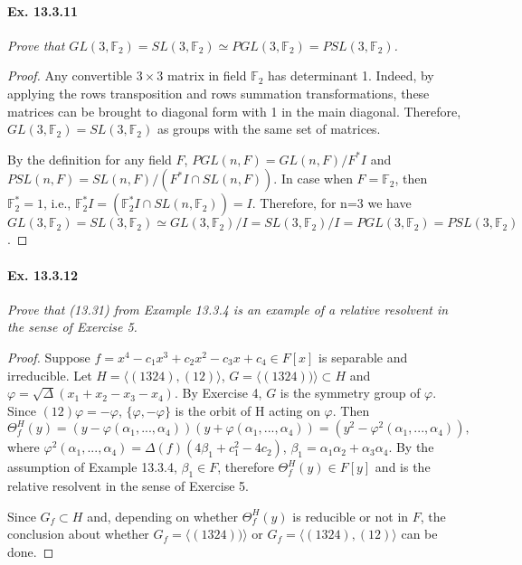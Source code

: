 \documentclass[11pt,a4paper]{article}
\begin{document}
\paragraph{Ex. 13.3.11}

{\it Prove that  $GL(3,\mathbb{F}_2)=SL(3,\mathbb{F}_2) \simeq PGL(3,\mathbb{F}_2)=PSL(3,\mathbb{F}_2)$. 

\begin{proof}
Any convertible $3\times 3$ matrix in field $\mathbb{F}_2$ has determinant 1. Indeed, by applying the rows transposition and rows summation transformations, these matrices can be brought to diagonal form with 1 in the main diagonal. Therefore, $GL(3,\mathbb{F}_2)=SL(3,\mathbb{F}_2)$ as groups with the same set of matrices.

By the definition for any field $F$, $PGL(n,F)=GL(n,F)/F^*I$ and $PSL(n,F)=SL(n,F)/(F^*I\cap SL(n,F))$. In case when $F=\mathbb{F}_2$, then $\mathbb{F}_2^*=1$, i.e., $\mathbb{F}_2^*I=(\mathbb{F}_2^*I\cap SL(n,\mathbb{F}_2))=I$. Therefore, for n=3 we have $GL(3,\mathbb{F}_2)=SL(3,\mathbb{F}_2) \simeq GL(3,\mathbb{F}_2)/I=SL(3,\mathbb{F}_2)/I=PGL(3,\mathbb{F}_2)=PSL(3,\mathbb{F}_2)$.
\end{proof}
}

\paragraph{Ex. 13.3.12}

{\it Prove that  (13.31) from Example 13.3.4 is an example of a relative resolvent in the sense of Exercise 5. 

\begin{proof}
Suppose $f=x^4-c_1x^3+c_2x^2-c_3x+c_4 \in F[x]$ is separable and irreducible.
Let $H=\langle (1324),(12) \rangle$,  $G=\langle (1324)) \rangle \subset H$ and $\varphi=\sqrt{\Delta}(x_1+x_2-x_3-x_4)$. By Exercise 4, $G$ is the symmetry group of $\varphi$. Since $(12)\varphi=-\varphi$,  $\{\varphi,-\varphi\}$ is the orbit of H acting on $\varphi$.  Then $$\Theta_f^H(y)=( y - \varphi(\alpha_1,...,\alpha_4))( y + \varphi(\alpha_1,...,\alpha_4))=( y^2 - \varphi^2(\alpha_1,...,\alpha_4)),$$
where $\varphi^2(\alpha_1,...,\alpha_4)=\Delta(f)(4\beta_1+c_1^2-4c_2)$, $\beta_1=\alpha_1\alpha_2+\alpha_3\alpha_4$. By the assumption of Example 13.3.4, $\beta_1 \in F$, therefore $\Theta_f^H(y) \in F[y]$ and is the relative resolvent in the sense of Exercise 5. 

Since $G_f \subset H$ and, depending on whether $\Theta_f^H(y)$ is reducible or not in $F$, the conclusion about whether $G_f=\langle (1324)) \rangle$ or $G_f=\langle (1324),(12) \rangle$ can be done.  

\end{proof}
}
\end{document}
